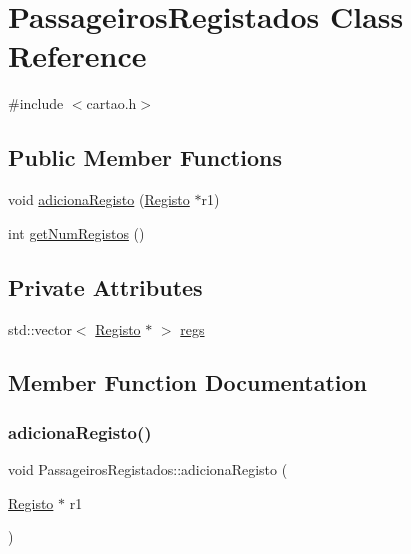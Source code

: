 \hypertarget{class_passageiros_registados}{}\section{Passageiros\+Registados Class Reference}
\label{class_passageiros_registados}


{\ttfamily \#include $<$cartao.\+h$>$}

\subsection*{Public Member Functions}
\begin{DoxyCompactItemize}
\item 
void \mbox{\hyperlink{class_passageiros_registados_af9e5da9a875bbd3c06f82bc0978bfc85}{adiciona\+Registo}} (\mbox{\hyperlink{class_registo}{Registo}} $\ast$r1)
\item 
int \mbox{\hyperlink{class_passageiros_registados_a498a9a9e6f162197bdd30f77e0a2f2ae}{get\+Num\+Registos}} ()
\end{DoxyCompactItemize}
\subsection*{Private Attributes}
\begin{DoxyCompactItemize}
\item 
std\+::vector$<$ \mbox{\hyperlink{class_registo}{Registo}} $\ast$ $>$ \mbox{\hyperlink{class_passageiros_registados_a8272ae4415158ec15f95b3331b0238f3}{regs}}
\end{DoxyCompactItemize}


\subsection{Member Function Documentation}
\mbox{\label{class_passageiros_registados_af9e5da9a875bbd3c06f82bc0978bfc85}} 
\subsubsection{\texorpdfstring{adiciona\+Registo()}{adicionaRegisto()}}
{\footnotesize\ttfamily void Passageiros\+Registados\+::adiciona\+Registo (\begin{DoxyParamCaption}\item[{\mbox{\hyperlink{class_registo}{Registo}} $\ast$}]{r1 }\end{DoxyParamCaption})}

